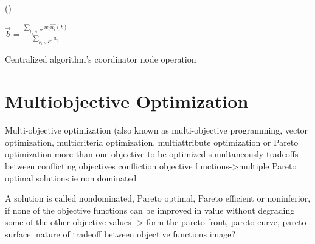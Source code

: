 \begin{algorithm}



\Fn(){}{
	$\vec{b}=\frac{ \sum_{p_i \in P'} {w_i\vec{u_i}(t)} }{ \sum_{p_i \in P'} {w_i} }$\;

}
\caption{Centralized algorithm's coordinator node operation\label{algo:centralizedCoordinatorNode}} 
\end{algorithm}


\section{Multiobjective Optimization} \label{sec:theorBack-MOP}

Multi-objective optimization (also known as multi-objective programming, vector optimization, multicriteria optimization, multiattribute optimization or Pareto optimization
more than one objective to be optimized simultaneously
tradeoffs between conflicting objectives
confliction objective functions->multiple Pareto optimal solutions ie non dominated

A solution is called nondominated, Pareto optimal, Pareto efficient or noninferior, if none of the objective functions can be improved in value without degrading some of the other objective values -> form the pareto front, pareto curve, pareto surface: nature of tradeoff between objective functions
image?

